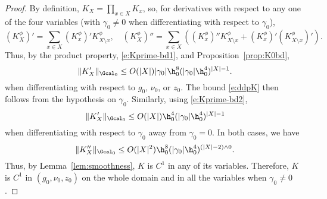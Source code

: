 \begin{proof}
By definition, $K_X = \prod_{x \in X} K_x$, so, for derivatives with respect to any one
of the four variables (with $\gamma_0 \neq 0$ when differentiating with respect to $\gamma_0$),
\begin{equation}
\label{e:KXprime}
(K^\phi_X)'  = \sum_{x \in X} (K^\phi_x)' K^\phi_{X \setminus x}, \quad
(K^\phi_X)'' = \sum_{x \in X} ((K^\phi_x)'' K^\phi_{X \setminus x} + (K^\phi_x)' (K^\phi_{X \setminus x})').
\end{equation}
Thus, by the product property, \eqref{e:Kprime-bd1}, and Proposition~\ref{prop:K0bd},
\begin{equation}
\|K'_X\|_{\Gcal_0}
  \le
O(|X|) |\gamma_0| \h_0^8 (|\gamma_0| \h_0^4)^{|X|-1}.
\end{equation}
when differentiating with respect to $g_0$, $\nu_0$, or $z_0$.
The bound \eqref{e:ddpK} then follows from the hypothesis on $\gamma_0$.
Similarly, using \eqref{e:Kprime-bd2},
\begin{equation}
\|K'_X\|_{\Gcal_0}
  \le
O(|X|) \h_0^4 (|\gamma_0| \h_0^4)^{|X|-1}
\end{equation}
when differentiating with respect to $\gamma_0$ away from $\gamma_0 = 0$.
In both cases, we have
\begin{equation}
\|K''_X\|_{\Gcal_0}
  \le
O(|X|^2) \h_0^8 (|\gamma_0| \h_0^4)^{(|X|-2) \wedge 0}.
\end{equation}
Thus, by Lemma~\ref{lem:smoothness}, $K$ is $C^1$ in any of its variables.
Therefore, $K$ is $C^1$ in $(g_0, \nu_0, z_0)$ on the whole domain and in all the variables when $\gamma_0 \ne 0$.


\end{proof}
